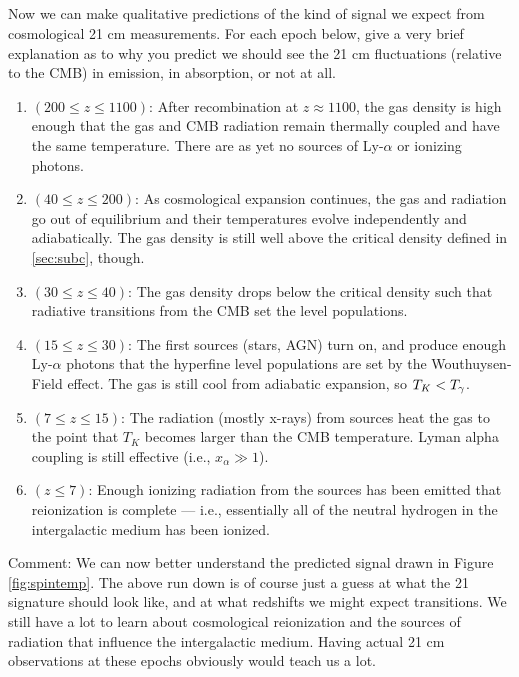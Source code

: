 \documentclass[11pt]{article}
\begin{document}
\subsection{}
Now we can make qualitative predictions of the kind of signal we expect from
cosmological 21 cm measurements. For each epoch below, give a very brief
explanation as to why you predict we should see the 21 cm fluctuations
(relative to the CMB) in emission, in absorption, or not at all.
\begin{enumerate}

\item $(200\le z\le 1100)$: After recombination at $z\approx1100$, the gas density is
high enough that the gas and CMB radiation remain thermally coupled and have
the same temperature. There are as yet no sources of Ly-$\alpha$ or ionizing
photons.

\item $(40\le z\le 200)$: As cosmological expansion continues, the gas and
radiation go out of equilibrium and their temperatures evolve independently and
adiabatically. The gas density is still well above the critical density defined
in \ref{sec:subc}, though.

\item $(30\le z\le 40)$: The gas density drops below the critical density such
that radiative transitions from the CMB set the level populations.

\item $(15\le z\le 30)$: The first sources (stars, AGN) turn on, and produce
enough Ly-$\alpha$ photons that the hyperfine level populations are set by the
Wouthuysen-Field effect. The gas is still cool from adiabatic expansion, so 
$T_K < {T_\gamma}$.

\item $(7\le z\le 15)$: The radiation (mostly x-rays) from sources heat the gas
to the point that $T_K$ becomes larger than the CMB temperature. Lyman alpha
coupling is still effective (i.e., $x_\alpha\gg1$).

\item $(z\le 7)$: Enough ionizing radiation from the sources has been emitted
that reionization is complete --- i.e., essentially all of the neutral hydrogen
in the intergalactic medium has been ionized.

\end{enumerate}

Comment: We can now better understand the predicted signal drawn in Figure \ref{fig:spintemp}.
The above run down is of course just a guess at what the 21 signature should
look like, and at what redshifts we might expect transitions. We still have a
lot to learn about cosmological reionization and the sources of radiation
that influence the intergalactic medium. Having actual 21 cm observations at
these epochs obviously would teach us a lot.
\end{document}
